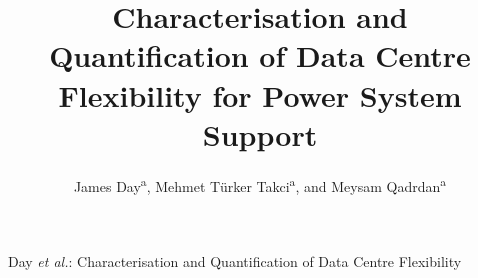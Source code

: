 \documentclass[lettersize,journal]{IEEEtran}
\begin{document}
\title{Characterisation and Quantification of Data Centre Flexibility for Power System Support}

\author{\color{blue} James Day\textsuperscript{a}, Mehmet Türker Takci\textsuperscript{a}, and Meysam Qadrdan\textsuperscript{a}}



\maketitle


{Day \MakeLowercase{\textit{et al.}}: Characterisation and Quantification of Data Centre Flexibility}
\end{document}
